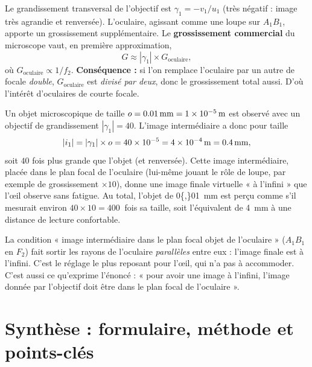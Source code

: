 \documentclass[11pt,a4paper]{article}
\newcommand{\gamm}{\gamma}             %
\begin{document}
\begin{theoreme}
Le grandissement transversal de l'objectif est $\gamm_1=-v_1/u_1$ (très négatif : image très agrandie
et renversée). L'oculaire, agissant comme une loupe sur $A_1B_1$, apporte un grossissement
supplémentaire. Le \textbf{grossissement commercial} du microscope vaut, en première approximation,
\[ G \approx \left|\gamm_1\right|\times G_{\text{oculaire}}, \]
où $G_{\text{oculaire}}\propto 1/f_2$. \textbf{Conséquence :} si l'on remplace l'oculaire par un autre
de focale \emph{double}, $G_{\text{oculaire}}$ est \emph{divisé par deux}, donc le grossissement total
aussi. D'où l'intérêt d'oculaires de courte focale.
\end{theoreme}

\begin{exemple}
Un objet microscopique de taille $o=\SI{0{,}01}{\milli\metre}=\SI{1e-5}{\metre}$ est observé avec un
objectif de grandissement $|\gamm_1|=40$. L'image intermédiaire a donc pour taille
\[ |i_1|=|\gamm_1|\times o=40\times 10^{-5}=\SI{4e-4}{\metre}=\SI{0{,}4}{\milli\metre}, \]
soit $40$ fois plus grande que l'objet (et renversée). Cette image intermédiaire, placée dans le plan
focal de l'oculaire (lui-même jouant le rôle de loupe, par exemple de grossissement $\times 10$),
donne une image finale virtuelle « à l'infini » que l'œil observe sans fatigue. Au total, l'objet de
\SI{0{,}01}{\milli\metre} est perçu comme s'il mesurait environ
$40\times 10=\SI{400}{}$ fois sa taille, soit l'équivalent de \SI{4}{\milli\metre} à une distance de
lecture confortable.
\end{exemple}

\begin{remarque}
La condition « image intermédiaire dans le plan focal objet de l'oculaire » ($A_1B_1$ en $F_2$) fait
sortir les rayons de l'oculaire \emph{parallèles} entre eux : l'image finale est à l'infini. C'est le
réglage le plus reposant pour l'œil, qui n'a pas à accommoder. C'est aussi ce qu'exprime l'énoncé :
« pour avoir une image à l'infini, l'image donnée par l'objectif doit être dans le plan focal de
l'oculaire ».
\end{remarque}

\section{Synthèse : formulaire, méthode et points-clés}
\end{document}
